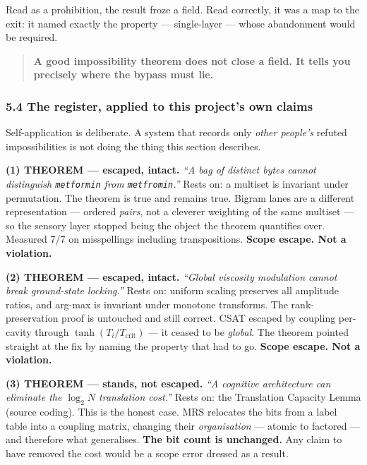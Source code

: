 \documentclass[
  11pt,
  a4paper,
]{article}
\begin{document}
Read as a prohibition, the result froze a field. Read correctly, it was
a map to the exit: it named exactly the property --- single-layer ---
whose abandonment would be required.

\begin{quote}
\textbf{A good impossibility theorem does not close a field. It tells
you precisely where the bypass must lie.}
\end{quote}

\subsubsection{5.4 The register, applied to this project's own
claims}\label{the-register-applied-to-this-projects-own-claims}

Self-application is deliberate. A system that records only \emph{other
people's} refuted impossibilities is not doing the thing this section
describes.

\textbf{(1) THEOREM --- escaped, intact.} \emph{``A bag of distinct
bytes cannot distinguish \texttt{metformin} from \texttt{metfromin}.''}
Rests on: a multiset is invariant under permutation. The theorem is true
and remains true. Bigram lanes are a different representation ---
ordered \emph{pairs}, not a cleverer weighting of the same multiset ---
so the sensory layer stopped being the object the theorem quantifies
over. Measured 7/7 on misspellings including transpositions.
\textbf{Scope escape. Not a violation.}

\textbf{(2) THEOREM --- escaped, intact.} \emph{``Global viscosity
modulation cannot break ground-state locking.''} Rests on: uniform
scaling preserves all amplitude ratios, and arg-max is invariant under
monotone transforms. The rank-preservation proof is untouched and still
correct. CSAT escaped by coupling per-cavity through
\(\tanh(T_i/T_{\text{crit}})\) --- it ceased to be \emph{global}. The
theorem pointed straight at the fix by naming the property that had to
go. \textbf{Scope escape. Not a violation.}

\textbf{(3) THEOREM --- stands, not escaped.} \emph{``A cognitive
architecture can eliminate the \(\log_2 N\) translation cost.''} Rests
on: the Translation Capacity Lemma (source coding). This is the honest
case. MRS relocates the bits from a label table into a coupling matrix,
changing their \emph{organisation} --- atomic to factored --- and
therefore what generalises. \textbf{The bit count is unchanged.} Any
claim to have removed the cost would be a scope error dressed as a
result.
\end{document}
